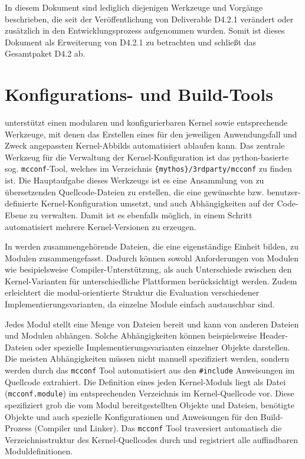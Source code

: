 In diesem Dokument sind lediglich diejenigen Werkzeuge und Vorgänge beschrieben,
die seit der Veröffentlichung von Deliverable D4.2.1 verändert oder zusätzlich in den
Entwicklungsprozess aufgenommen wurden. Somit ist dieses Dokument als
Erweiterung von D4.2.1 zu betrachten und schließt das Gesamtpaket D4.2 ab.

\section{Konfigurations- und Build-Tools}

\mythos unterstützt einen modularen und konfigurierbaren Kernel sowie
entsprechende Werkzeuge, mit denen das Erstellen eines für den jeweiligen
Anwendungsfall und Zweck angepassten Kernel-Abbilds automatisiert ablaufen kann.
Das zentrale Werkzeug für die Verwaltung der Kernel-Konfiguration ist das
python-basierte sog. \texttt{mcconf}-Tool, welches im Verzeichnis
\texttt{\{mythos\}/3rdparty/mcconf} zu finden ist. Die Hauptaufgabe
dieses Werkzeugs ist es eine Ansammlung von zu übersetzenden Quellcode-Dateien
zu erstellen, die eine gewünschte bzw. benutzer-definierte Kernel-Konfiguration
umsetzt, und auch Abhängigkeiten auf der Code-Ebene zu verwalten. Damit ist
es ebenfalls möglich, in einem Schritt automatisiert mehrere Kernel-Versionen zu
erzeugen. 

In \mythos werden zusammengehörende Dateien, die eine eigenständige Einheit
bilden, zu Modulen zusammengefasst. Dadurch können sowohl Anforderungen von
Modulen wie besipielsweise Compiler-Unterstützung, als auch Unterschiede
zwischen den Kernel-Varianten für unterschiedliche Plattformen berücksichtigt
werden. Zudem erleichtert die modul-orientierte Struktur die Evaluation
verschiedener Implementierungsvarianten, da einzelne Module einfach austauschbar
sind.

Jedes Modul stellt eine Menge von Dateien bereit und kann von anderen Dateien
und Modulen abhängen. Solche Abhängigkeiten können beispielsweise Header-Dateien
oder spezielle Implementierungsvarianten einzelner Objekte darstellen. Die
meisten Abhängigkeiten müssen nicht manuell spezifiziert werden, sondern werden
durch das \texttt{mcconf} Tool automatisiert aus den \texttt{\#include}
Anweisungen im Quellcode extrahiert. Die Definition eines jeden Kernel-Moduls
liegt als Datei (\texttt{mcconf.module}) im entsprechenden Verzeichnis im
Kernel-Quellcode vor. Diese spezifiziert grob die vom Modul bereitgestellten
Objekte und Dateien, benötigte Objekte und auch spezielle Konfigurationen und
Anweisungen für den Build-Prozess (Compiler und Linker). Das \texttt{mcconf}
Tool traversiert automatisch die Verzeichnisstruktur des Kernel-Quellcodes durch
und registriert alle auffindbaren Moduldefinitionen.

